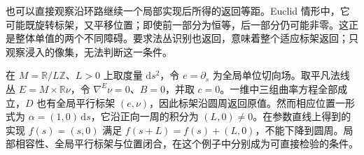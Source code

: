 \ProseParagraphBreak

也可以直接观察沿环路继续一个局部实现后所得的返回等距。Euclid 情形中，它可能既旋转标架，又平移位置；即使前一部分为恒等，后一部分仍可能非零。这正是整体单值的两个不同障碍。要求法丛识别也返回，意味着整个适应标架返回；只观察浸入的像集，无法判断这一条件。

\begin{example}\label{g3:exm:flat-circle-development-period}
	在 \(M=\mathbb R/L\mathbb Z\)、\(L>0\) 上取度量 \(\mathrm ds^2\)，令 \(e=\partial_s\) 为全局单位切向场。取平凡法线丛 \(E=M\times\mathbb R\nu\)，令 \(\nabla^E\nu=0\)、\(B=0\)，并取 \(c=0\)。一维中三组曲率方程全部成立，\(D\) 也有全局平行标架 \((e,\nu)\)，因此标架沿圆周返回原值。然而相应位置一形式为 \(\alpha=(1,0)\,\mathrm ds\)，它沿正向一周的积分为 \((L,0)\ne0\)。在参数直线上得到的实现 \(f(s)=(s,0)\) 满足 \(f(s+L)=f(s)+(L,0)\)，不能下降到圆周。局部相容性、全局平行标架与位置闭合，在这个例子中分别成为可直接检验的条件。
\end{example}

